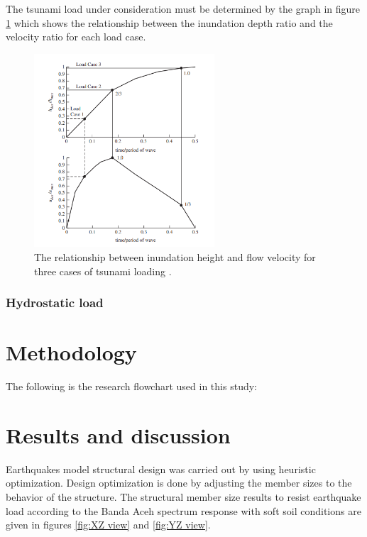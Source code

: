 \documentclass{cup-pan}
\begin{document}
The tsunami load under consideration must be determined by the graph in figure \ref{fig:loadcases} which shows the relationship between the inundation depth ratio and the velocity ratio for each load case.

\begin{figure}[H]
\centering
\includegraphics[width=0.6\textwidth]{fig1.png}
\caption{The relationship between inundation height and flow velocity for three cases of tsunami loading \citep{leet}.}
\label{fig:loadcases}
\end{figure}

\subsubsection{Hydrostatic load}

\section{Methodology}
\label{sec:method}

The following is the research flowchart used in this study:

\section{Results and discussion}
\label{sec:results}

Earthquakes model structural design was carried out by using heuristic optimization. Design optimization is done by adjusting the member sizes to the behavior of the structure. The structural member size results to resist earthquake load according to the Banda Aceh spectrum response with soft soil conditions are given in figures \ref{fig:XZ view} and \ref{fig:YZ view}.
\end{document}
